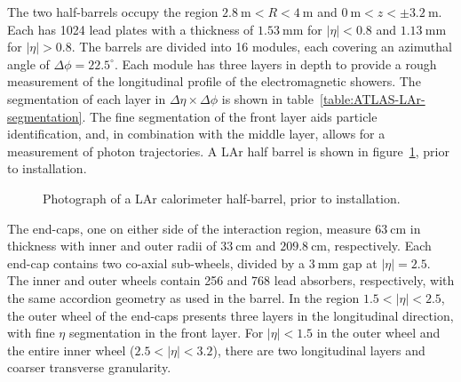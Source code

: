 The two half-barrels occupy the region $\SI{2.8}{\meter}<R<\SI{4}{\meter}$ and $\SI{0}{\meter}<z<\pm\SI{3.2}{\meter}$. Each has 1024 lead plates with a thickness of $\SI{1.53}{\milli\meter}$ for $|\eta|<0.8$ and $\SI{1.13}{\milli\meter}$ for $|\eta|>0.8$. The barrels are divided into 16 modules, each covering an azimuthal angle of $\Delta \phi = 22.5^{\circ}$. Each module has three layers in depth to provide a rough measurement of the longitudinal profile of the electromagnetic showers. The segmentation of each layer in $\Delta\eta\times\Delta\phi$ is shown in table~\ref{table:ATLAS-LAr-segmentation}. The fine segmentation of the front layer aids particle identification, and, in combination with the middle layer, allows for a measurement of photon trajectories. A LAr half barrel is shown in figure~\ref{fig:LAr-barrel}, prior to installation.

\begin{figure}[htbp]
	\centering
	\caption{Photograph of a LAr calorimeter half-barrel, prior to installation.}
	\label{fig:LAr-barrel}
\end{figure}


The end-caps, one on either side of the interaction region, measure $\SI{63}{\centi\meter}$ in thickness with inner and outer radii of $\SI{33}{\centi\meter}$ and $\SI{209.8}{\centi\meter}$, respectively. Each end-cap contains two co-axial sub-wheels, divided by a $\SI{3}{\milli\meter}$ gap at $|\eta|=2.5$. The inner and outer wheels contain 256 and 768 lead absorbers, respectively, with the same accordion geometry as used in the barrel. In the region $1.5<|\eta|<2.5$, the outer wheel of the end-caps presents three layers in the longitudinal direction, with fine $\eta$ segmentation in the front layer. For $|\eta|<1.5$ in the outer wheel and the entire inner wheel ($2.5<|\eta|<3.2$), there are two longitudinal layers and coarser transverse granularity.

